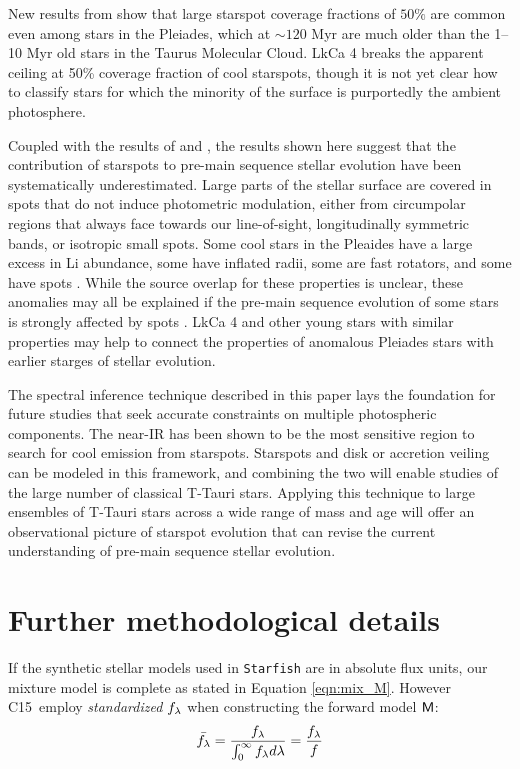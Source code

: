 \documentclass[twocolumn]{emulateapj}%
\newcommand{\iancze}{{\sc C15}}
\begin{document}
New results from \citet{fang2016} show that large starspot coverage fractions of $50\%$ are common even among stars in the Pleiades, which at $\sim 120$ Myr are much older than the 1--10 Myr old stars in the Taurus Molecular Cloud.  LkCa 4 breaks the apparent ceiling at 50\% coverage fraction of cool starspots, though it is not yet clear how to classify stars for which the minority of the surface is purportedly the ambient photosphere.

Coupled with the results of \citet{fang2016} and \citet{covey16}, the results shown here suggest that the contribution of starspots to pre-main sequence stellar evolution have been systematically underestimated.  Large parts of the stellar surface are covered in spots that do not induce photometric modulation, either from circumpolar regions that always face towards our line-of-sight, longitudinally symmetric bands, or isotropic small spots.  Some cool stars in the Pleaides have a large excess in Li abundance, some have inflated radii, some are fast rotators, and some have spots \citep[e.g.][]{somers15b}.  While the source overlap for these properties is unclear, these anomalies may all be explained if the pre-main sequence evolution of some stars is strongly affected by spots \citep{somers15}.  LkCa 4 and other young stars with similar properties may help to connect the properties of anomalous Pleiades stars with earlier starges of stellar evolution.


The spectral inference technique described in this paper lays the foundation for future studies that seek accurate constraints on multiple photospheric components.  The near-IR has been shown to be the most sensitive region to search for cool emission from starspots.  Starspots and disk or accretion veiling can be modeled in this framework, and combining the two will enable studies of the large number of classical T-Tauri stars.  Applying this technique to large ensembles of T-Tauri stars across a wide range of mass and age will offer an observational picture of starspot evolution that can revise the current understanding of pre-main sequence stellar evolution.  


\clearpage
\pagebreak


\appendix

\section{Further methodological details}
\label{methods-details}

If the synthetic stellar models used in \texttt{Starfish} are in absolute flux units, our mixture model is complete as stated in Equation \ref{eqn:mix_M}.  However \iancze\ employ \emph{standardized} $f_\lambda$ when constructing the forward model $\mathsf{M}$:
\begin{eqnarray} \label{eqn:normalization}
\bar {f_\lambda} = \frac{f_\lambda}{\int_{0}^{\infty} f_\lambda d\lambda} = \frac{f_\lambda}{f}
\end{eqnarray}
\end{document}
